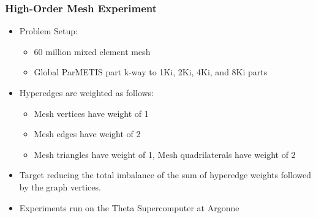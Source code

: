 \documentclass[aspectratio=169]{beamer}
\begin{document}
\begin{frame}
  \frametitle{High-Order Mesh Experiment}
  \begin{itemize}
    \item Problem Setup:
    \begin{itemize}
    \item 60 million mixed element mesh
    \item Global ParMETIS part k-way to 1Ki, 2Ki, 4Ki, and 8Ki parts
    \end{itemize}
    \item Hyperedges are weighted as follows:
      \begin{itemize}
      \item Mesh vertices have weight of 1
      \item Mesh edges have weight of 2
      \item Mesh triangles have weight of 1, Mesh quadrilaterals have weight of 2
      \end{itemize}
    \item Target reducing the total imbalance of the sum of hyperedge weights followed by the graph vertices.
    \item Experiments run on the Theta Supercomputer at Argonne
  \end{itemize}
\end{frame}
\end{document}
